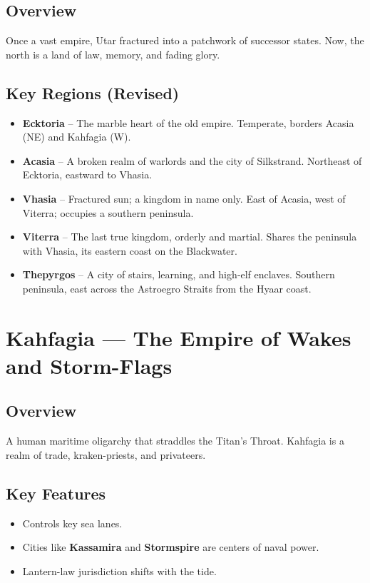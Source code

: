 \subsection*{Overview}
Once a vast empire, Utar fractured into a patchwork of successor states. Now, the north is a land of law, memory, and fading glory.

\subsection*{Key Regions (Revised)}
\begin{itemize}[leftmargin=*]
    \item \textbf{Ecktoria} – The marble heart of the old empire. Temperate, borders Acasia (NE) and Kahfagia (W).
    \item \textbf{Acasia} – A broken realm of warlords and the city of Silkstrand. Northeast of Ecktoria, eastward to Vhasia.
    \item \textbf{Vhasia} – Fractured sun; a kingdom in name only. East of Acasia, west of Viterra; occupies a southern peninsula.
    \item \textbf{Viterra} – The last true kingdom, orderly and martial. Shares the peninsula with Vhasia, its eastern coast on the Blackwater.
    \item \textbf{Thepyrgos} – A city of stairs, learning, and high‑elf enclaves. Southern peninsula, east across the Astroegro Straits from the Hyaar coast.
\end{itemize}

\section{Kahfagia — The Empire of Wakes and Storm-Flags}
\label{sec:lore-kahfagia}

\subsection*{Overview}
A human maritime oligarchy that straddles the Titan’s Throat. Kahfagia is a realm of trade, kraken-priests, and privateers.

\subsection*{Key Features}
\begin{itemize}[leftmargin=*]
    \item Controls key sea lanes.
    \item Cities like \textbf{Kassamira} and \textbf{Stormspire} are centers of naval power.
    \item Lantern-law jurisdiction shifts with the tide.
\end{itemize}

